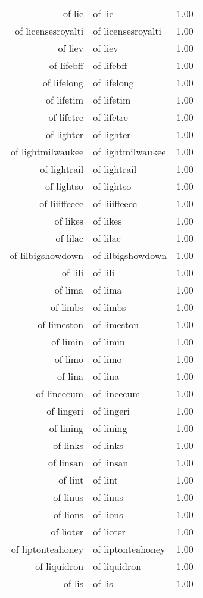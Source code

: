 \begin{table}[ht]
\begin{tabular}{rlr}
  of lic & of lic & 1.00 \\ 
  of licensesroyalti & of licensesroyalti & 1.00 \\ 
  of liev & of liev & 1.00 \\ 
  of lifebff & of lifebff & 1.00 \\ 
  of lifelong & of lifelong & 1.00 \\ 
  of lifetim & of lifetim & 1.00 \\ 
  of lifetre & of lifetre & 1.00 \\ 
  of lighter & of lighter & 1.00 \\ 
  of lightmilwaukee & of lightmilwaukee & 1.00 \\ 
  of lightrail & of lightrail & 1.00 \\ 
  of lightso & of lightso & 1.00 \\ 
  of liiiffeeee & of liiiffeeee & 1.00 \\ 
  of likes & of likes & 1.00 \\ 
  of lilac & of lilac & 1.00 \\ 
  of lilbigshowdown & of lilbigshowdown & 1.00 \\ 
  of lili & of lili & 1.00 \\ 
  of lima & of lima & 1.00 \\ 
  of limbs & of limbs & 1.00 \\ 
  of limeston & of limeston & 1.00 \\ 
  of limin & of limin & 1.00 \\ 
  of limo & of limo & 1.00 \\ 
  of lina & of lina & 1.00 \\ 
  of lincecum & of lincecum & 1.00 \\ 
  of lingeri & of lingeri & 1.00 \\ 
  of lining & of lining & 1.00 \\ 
  of links & of links & 1.00 \\ 
  of linsan & of linsan & 1.00 \\ 
  of lint & of lint & 1.00 \\ 
  of linus & of linus & 1.00 \\ 
  of lions & of lions & 1.00 \\ 
  of lioter & of lioter & 1.00 \\ 
  of liptonteahoney & of liptonteahoney & 1.00 \\ 
  of liquidron & of liquidron & 1.00 \\ 
  of lis & of lis & 1.00 \\ 

\end{tabular}
\end{table}
